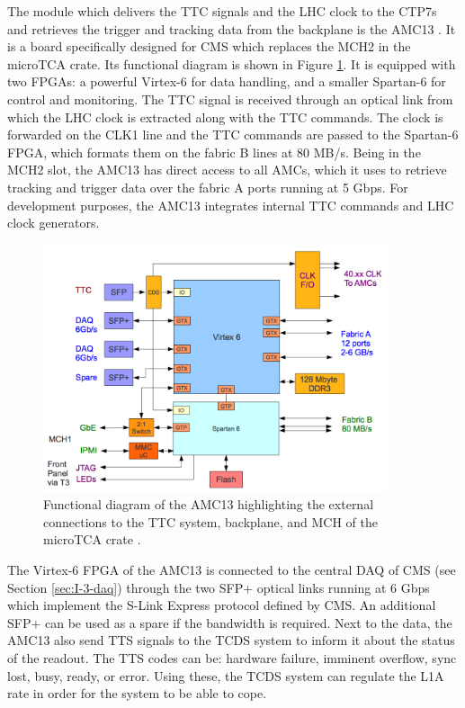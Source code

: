       The module which delivers the TTC signals and the LHC clock to the CTP7s and retrieves the trigger and tracking data from the backplane is the AMC13 \cite{AMC13}. It is a board specifically designed for CMS which replaces the MCH2 in the microTCA crate. Its functional diagram is shown in Figure \ref{fig:II-2-amc13}. It is equipped with two FPGAs: a powerful Virtex-6 for data handling, and a smaller Spartan-6 for control and monitoring. The TTC signal is received through an optical link from which the LHC clock is extracted along with the TTC commands. The clock is forwarded on the CLK1 line and the TTC commands are passed to the Spartan-6 FPGA, which formats them on the fabric B lines at 80 MB/s. Being in the MCH2 slot, the AMC13 has direct access to all AMCs, which it uses to retrieve tracking and trigger data over the fabric A ports running at 5 Gbps. For development purposes, the AMC13 integrates internal TTC commands and LHC clock generators. \\

      \begin{figure}[t!]
        \centering
        \includegraphics[width=0.9\textwidth]{img/II-2-daq/amc13.png}
        \caption{Functional diagram of the AMC13 highlighting the external connections to the TTC system, backplane, and MCH of the microTCA crate \cite{AMC13}.}
        \label{fig:II-2-amc13}
      \end{figure}

      The Virtex-6 FPGA of the AMC13 is connected to the central DAQ of CMS (see Section \ref{sec:I-3-daq}) through the two SFP+ optical links running at 6 Gbps which implement the S-Link Express protocol defined by CMS. An additional SFP+ can be used as a spare if the bandwidth is required. Next to the data, the AMC13 also send TTS signals to the TCDS system to inform it about the status of the readout. The TTS codes can be: hardware failure, imminent overflow, sync lost, busy, ready, or error. Using these, the TCDS system can regulate the L1A rate in order for the system to be able to cope.

